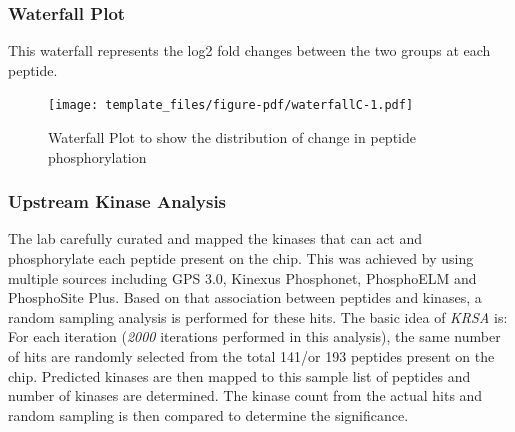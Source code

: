 \documentclass[
  letterpaper,
  DIV=11,
  numbers=noendperiod]{scrreport}
\begin{document}
\hypertarget{waterfall-plot-2}{%
\subsubsection{Waterfall Plot}\label{waterfall-plot-2}}

This waterfall represents the log2 fold changes between the two groups
at each peptide.

\begin{figure}[htbp]

{\centering \texttt{[image: template\_files/figure-pdf/waterfallC-1.pdf]}

}

\caption{Waterfall Plot to show the distribution of change in peptide
phosphorylation}

\end{figure}

\hypertarget{upstream-kinase-analysis-2}{%
\subsubsection{Upstream Kinase
Analysis}\label{upstream-kinase-analysis-2}}

The lab carefully curated and mapped the kinases that can act and
phosphorylate each peptide present on the chip. This was achieved by
using multiple sources including GPS 3.0, Kinexus Phosphonet, PhosphoELM
and PhosphoSite Plus. Based on that association between peptides and
kinases, a random sampling analysis is performed for these hits. The
basic idea of \emph{KRSA} is: For each iteration (\emph{2000} iterations
performed in this analysis), the same number of hits are randomly
selected from the total 141/or 193 peptides present on the chip.
Predicted kinases are then mapped to this sample list of peptides and
number of kinases are determined. The kinase count from the actual hits
and random sampling is then compared to determine the significance.
\end{document}
